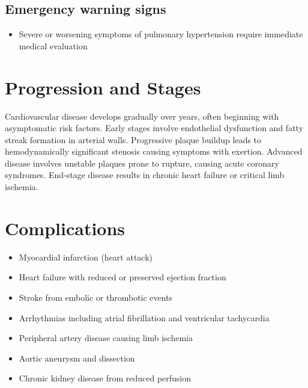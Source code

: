 \subsection{Emergency warning signs}
\begin{itemize}[noitemsep]
  \item Severe or worsening symptoms of pulmonary hypertension require immediate medical evaluation
\end{itemize}
\section{Progression and Stages}
Cardiovascular disease develops gradually over years, often beginning with asymptomatic risk factors. Early stages involve endothelial dysfunction and fatty streak formation in arterial walls. Progressive plaque buildup leads to hemodynamically significant stenosis causing symptoms with exertion. Advanced disease involves unstable plaques prone to rupture, causing acute coronary syndromes. End-stage disease results in chronic heart failure or critical limb ischemia.
\section{Complications}
\begin{itemize}[noitemsep]
  \item Myocardial infarction (heart attack)
  \item Heart failure with reduced or preserved ejection fraction
  \item Stroke from embolic or thrombotic events
  \item Arrhythmias including atrial fibrillation and ventricular tachycardia
  \item Peripheral artery disease causing limb ischemia
  \item Aortic aneurysm and dissection
  \item Chronic kidney disease from reduced perfusion
\end{itemize}
